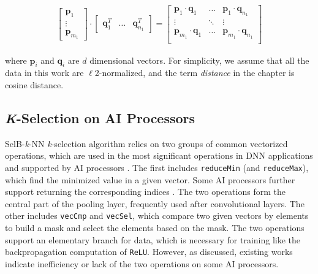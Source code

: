 \documentclass[12pt]{extbook}
\begin{document}
\begin{equation}
    \label{eq:dot_products}
    \begin{aligned}
    \begin{bmatrix} 
        \boldsymbol{p}_{1} \\
        \vdots \\
        \boldsymbol{p}_{m_1}
    \end{bmatrix}
    \cdot
    \begin{bmatrix} 
        \boldsymbol{q}_{1}^{T} &
        \dots &
        \boldsymbol{q}_{n_1}^{T}
    \end{bmatrix}
    =
    \begin{bmatrix} 
        \boldsymbol{p}_{1} \cdot \boldsymbol{q}_{1} &
        \dots &
        \boldsymbol{p}_{1} \cdot \boldsymbol{q}_{n_1} \\
        \vdots & \ddots & \vdots \\
        \boldsymbol{p}_{m_1} \cdot \boldsymbol{q}_{1} &
        \dots &
        \boldsymbol{p}_{m_1} \cdot \boldsymbol{q}_{n_1} \\
    \end{bmatrix}
    \end{aligned}
    \end{equation}

where $\boldsymbol{p}_{i}$ and $\boldsymbol{q}_{i}$ are $d$ dimensional vectors. For simplicity, we assume that all the data in this work are $\ell$2-normalized, and the term \textit{distance} in the chapter is cosine distance.

\subsection{\textit{K}-Selection on AI Processors}

SelB-\textit{k}-NN \textit{k}-selection algorithm relies on two groups of common vectorized operations, which are used in the most significant operations in DNN applications and supported by AI processors \cite{CANN, jax, cambricon}. The first includes \verb|reduceMin| (and \verb|reduceMax|), which find the minimized value in a given vector. Some AI processors further support returning the corresponding indices \cite{CANN}. The two operations form the central part of the pooling layer, frequently used after convolutional layers. The other includes \verb|vecCmp| and \verb|vecSel|, which compare two given vectors by elements to build a mask and select the elements based on the mask. The two operations support an elementary branch for data, which is necessary for training like the backpropagation computation of \verb|ReLU|. However, as discussed, existing works \cite{DBLP:conf/icpp/JiW21, cambricon, CANN} indicate inefficiency or lack of the two operations on some AI processors.
\end{document}
